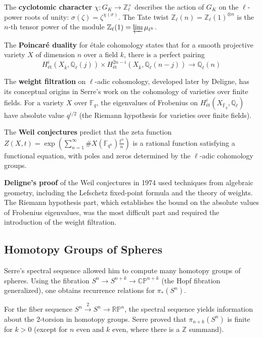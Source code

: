 The \textbf{cyclotomic character} $\chi: G_K \to \mathbb{Z}_\ell^\times$ describes the action of $G_K$ on the $\ell$-power roots of unity: $\sigma(\zeta) = \zeta^{\chi(\sigma)}$. The Tate twist $\mathbb{Z}_\ell(n) = \mathbb{Z}_\ell(1)^{\otimes n}$ is the $n$-th tensor power of the module $\mathbb{Z}_\ell(1) = \varprojlim \mu_{\ell^k}$.

The \textbf{Poincaré duality} for étale cohomology states that for a smooth projective variety $X$ of dimension $n$ over a field $k$, there is a perfect pairing
\[H^i_{\text{ét}}(X_{\overline{k}}, \mathbb{Q}_\ell(j)) \times H^{2n-i}_{\text{ét}}(X_{\overline{k}}, \mathbb{Q}_\ell(n-j)) \to \mathbb{Q}_\ell(n)\]

The \textbf{weight filtration} on $\ell$-adic cohomology, developed later by Deligne, has its conceptual origins in Serre's work on the cohomology of varieties over finite fields. For a variety $X$ over $\mathbb{F}_q$, the eigenvalues of Frobenius on $H^i_{\text{ét}}(X_{\overline{\mathbb{F}}_q}, \mathbb{Q}_\ell)$ have absolute value $q^{i/2}$ (the Riemann hypothesis for varieties over finite fields).

The \textbf{Weil conjectures} predict that the zeta function $Z(X, t) = \exp\left(\sum_{n=1}^\infty \#X(\mathbb{F}_{q^n}) \frac{t^n}{n}\right)$ is a rational function satisfying a functional equation, with poles and zeros determined by the $\ell$-adic cohomology groups.

\textbf{Deligne's proof} of the Weil conjectures in 1974 used techniques from algebraic geometry, including the Lefschetz fixed-point formula and the theory of weights. The Riemann hypothesis part, which establishes the bound on the absolute values of Frobenius eigenvalues, was the most difficult part and required the introduction of the weight filtration.

\subsection{Homotopy Groups of Spheres}

Serre's spectral sequence allowed him to compute many homotopy groups of spheres. Using the fibration $S^n \to S^{n+k} \to \mathbb{CP}^{n+k}$ (the Hopf fibration generalized), one obtains recurrence relations for $\pi_*(S^n)$.

For the fiber sequence $S^n \xrightarrow{2} S^n \to \mathbb{RP}^n$, the spectral sequence yields information about the 2-torsion in homotopy groups. Serre proved that $\pi_{n+k}(S^n)$ is finite for $k > 0$ (except for $n$ even and $k$ even, where there is a $\mathbb{Z}$ summand).

